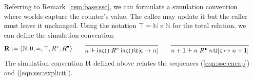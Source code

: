 \documentclass[acmsmall,screen,review,anonymous]{acmart}
\newcommand{\kw}[1]{\ensuremath{ \mathsf{#1} }}
\newcommand{\que}{\circ}
\newcommand{\ans}{\bullet}
\newcommand{\intl}[1]{#1^0}
\begin{document}
\begin{example} \label{ex:base:ssc} %
Referring to Remark~\ref{rem:base:ssc},
we can formulate a simulation convention
where worlds capture the counter's value.
The callee may update it
but the caller must leave it unchanged.
Using the notation $\top = \mathbb{N} \times \mathbb{N}$
for the total relation,
we can define the simulation convention:
\[
  \mathbf{R} := \langle \mathbb{N}, 0, {=}, \top, R^\que, R^\ans \rangle
  \qquad
  \begin{prooftree}
    \infer0{n \Vdash \kw{inc}() \mathrel{R^\que} \kw{inc}()@[\kw{c} \mapsto n]}
  \end{prooftree}
  \qquad
  \begin{prooftree}
    \infer0{n + 1 \Vdash n \mathrel{R^\ans} n@[\kw{c} \mapsto n + 1]}
  \end{prooftree}
\]
The simulation convention $\mathbf{R}$ defined above
relates the sequences (\ref{eqn:ssc:encap}) and (\ref{eqn:ssc:explicit}).
\end{example}

\end{document}
